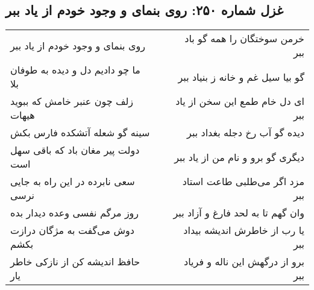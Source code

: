 \begin{center}
\section*{غزل شماره ۲۵۰: روی بنمای و وجود خودم از یاد ببر}
\label{sec:sh250}
\begin{longtable}{l p{0.5cm} r}
روی بنمای و وجود خودم از یاد ببر
&&
خرمن سوختگان را همه گو باد ببر
\\
ما چو دادیم دل و دیده به طوفان بلا
&&
گو بیا سیل غم و خانه ز بنیاد ببر
\\
زلف چون عنبر خامش که ببوید هیهات
&&
ای دل خام طمع این سخن از یاد ببر
\\
سینه گو شعله آتشکده فارس بکش
&&
دیده گو آب رخ دجله بغداد ببر
\\
دولت پیر مغان باد که باقی سهل است
&&
دیگری گو برو و نام من از یاد ببر
\\
سعی نابرده در این راه به جایی نرسی
&&
مزد اگر می‌طلبی طاعت استاد ببر
\\
روز مرگم نفسی وعده دیدار بده
&&
وان گهم تا به لحد فارغ و آزاد ببر
\\
دوش می‌گفت به مژگان درازت بکشم
&&
یا رب از خاطرش اندیشه بیداد ببر
\\
حافظ اندیشه کن از نازکی خاطر یار
&&
برو از درگهش این ناله و فریاد ببر
\\
\end{longtable}
\end{center}
